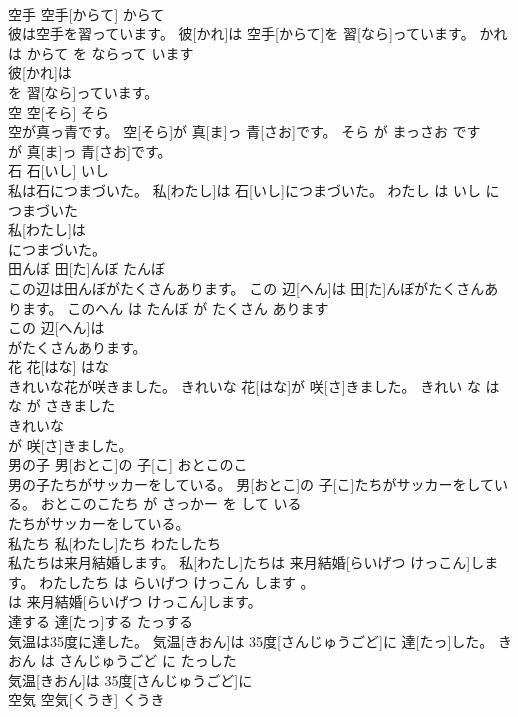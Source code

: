 \documentclass[8pt]{extreport}
\begin{document}
\begin{CJK}{UTF8}{min}
\\	空手	空手[からて]	からて	
\\	彼は空手を習っています。	彼[かれ]は 空手[からて]を 習[なら]っています。	かれ は からて を ならって います	
\\	彼[かれ]は
\\	を 習[なら]っています。			
\\	空	空[そら]	そら	
\\	空が真っ青です。	空[そら]が 真[ま]っ 青[さお]です。	そら が まっさお です	
\\	が 真[ま]っ 青[さお]です。			
\\	石	石[いし]	いし	
\\	私は石につまづいた。	私[わたし]は 石[いし]につまづいた。	わたし は いし に つまづいた	
\\	私[わたし]は
\\	につまづいた。			
\\	田んぼ	田[た]んぼ	たんぼ	
\\	この辺は田んぼがたくさんあります。	この 辺[へん]は 田[た]んぼがたくさんあります。	このへん は たんぼ が たくさん あります	
\\	この 辺[へん]は
\\	がたくさんあります。			
\\	花	花[はな]	はな	
\\	きれいな花が咲きました。	きれいな 花[はな]が 咲[さ]きました。	きれい な はな が さきました	
\\	きれいな
\\	が 咲[さ]きました。			
\\	男の子	男[おとこ]の 子[こ]	おとこのこ	
\\	男の子たちがサッカーをしている。	男[おとこ]の 子[こ]たちがサッカーをしている。	おとこのこたち が さっかー を して いる	
\\	たちがサッカーをしている。			
\\	私たち	私[わたし]たち	わたしたち	
\\	私たちは来月結婚します。	私[わたし]たちは 来月結婚[らいげつ けっこん]します。	わたしたち は らいげつ けっこん します 。	
\\	は 来月結婚[らいげつ けっこん]します。			
\\	達する	達[たっ]する	たっする	
\\	気温は35度に達した。	気温[きおん]は 35度[さんじゅうごど]に 達[たっ]した。	きおん は さんじゅうごど に たっした	
\\	気温[きおん]は 35度[さんじゅうごど]に
\\	空気	空気[くうき]	くうき	

\end{CJK}
\end{document}
